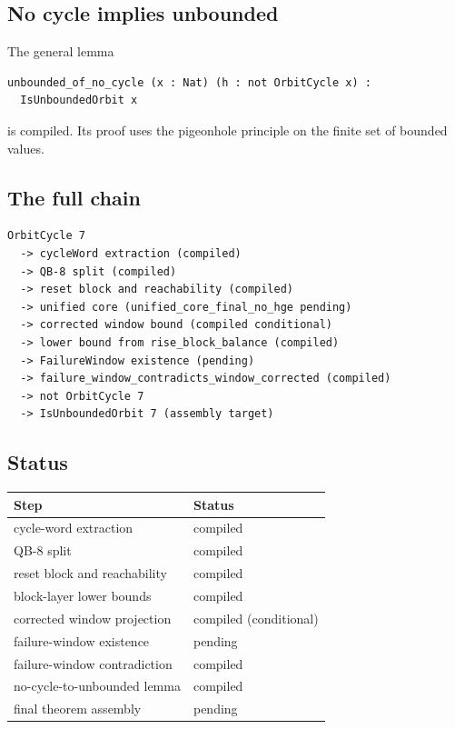 \subsection{No cycle implies unbounded}

The general lemma
\begin{verbatim}
unbounded_of_no_cycle (x : Nat) (h : not OrbitCycle x) :
  IsUnboundedOrbit x
\end{verbatim}
is compiled.  Its proof uses the pigeonhole principle on the finite
set of bounded values.

\subsection{The full chain}

\begin{verbatim}
OrbitCycle 7
  -> cycleWord extraction (compiled)
  -> QB-8 split (compiled)
  -> reset block and reachability (compiled)
  -> unified core (unified_core_final_no_hge pending)
  -> corrected window bound (compiled conditional)
  -> lower bound from rise_block_balance (compiled)
  -> FailureWindow existence (pending)
  -> failure_window_contradicts_window_corrected (compiled)
  -> not OrbitCycle 7
  -> IsUnboundedOrbit 7 (assembly target)
\end{verbatim}

\subsection{Status}

\begin{center}
\small
\begin{tabular}{@{}p{}p{}@{}}
\toprule
Step & Status \\
\midrule
cycle-word extraction & compiled \\
QB-8 split & compiled \\
reset block and reachability & compiled \\
block-layer lower bounds & compiled \\
corrected window projection & compiled (conditional) \\
failure-window existence & pending \\
failure-window contradiction & compiled \\
no-cycle-to-unbounded lemma & compiled \\
final theorem assembly & pending \\
\bottomrule
\end{tabular}
\end{center}

